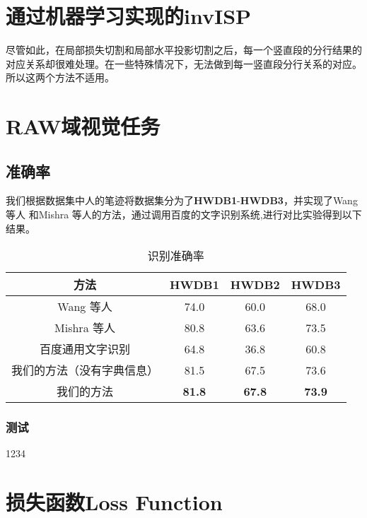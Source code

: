 \documentclass[winfonts]{njuthesis}
\begin{document}
\section{通过机器学习实现的invISP}
尽管如此，在局部损失切割和局部水平投影切割之后，每一个竖直段的分行结果的对应关系却很难处理。在一些特殊情况下，无法做到每一竖直段分行关系的对应。所以这两个方法不适用。




\section{RAW域视觉任务}

\subsection{准确率}
我们根据数据集中人的笔迹将数据集分为了\textbf{HWDB1}-\textbf{HWDB3}，并实现了Wang 等人\cite{wang2012end} 和Mishra 等人\cite{mishra2012scene}的方法，通过调用百度的文字识别系统\cite{baiduapi},进行对比实验得到以下结果。

\vspace{0.2cm}
\begin{table}[htbp]
\setlength{\belowcaptionskip}{5pt}
  \centering
  \begin{tabular}{cccc}
    \toprule
    \textbf{方法} & \textbf{HWDB1} & \textbf{HWDB2} & \textbf{HWDB3} \\
    \midrule
    Wang 等人\cite{wang2012end}   			& 74.0 & 60.0 & 68.0  \\
    Mishra 等人\cite{mishra2012scene}		 	& 80.8 & 63.6 & 73.5  \\
    百度通用文字识别\cite{baiduapi}		& 64.8 & 36.8 & 60.8 \\
    \midrule
    我们的方法（没有字典信息）& 81.5 & 67.5 & 73.6  \\
    我们的方法	  		& \textbf{81.8} & \textbf{67.8} & \textbf{73.9}  \\
    \bottomrule
  \end{tabular}
  \vspace{0.2cm}
  \caption{识别准确率}\label{table:result}
\end{table}

\subsubsection{测试}
1234

\section{损失函数Loss Function}
\end{document}
